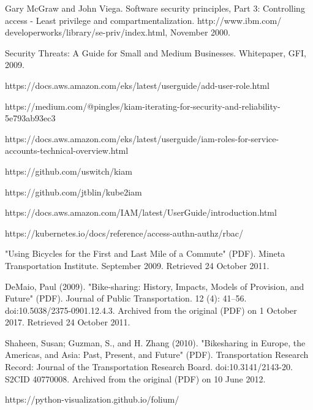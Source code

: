 \documentclass[thesis=M,czech]{FITthesis}[2019/12/23]
\theoremstyle{plain}
\theoremstyle{definition}
\begin{document}
\begin{thebibliography}{9}

Gary McGraw and John Viega. Software security principles, Part 3: Controlling access - Least privilege and compartmentalization. http://www.ibm.com/
developerworks/library/se-priv/index.html, November 2000.


Security Threats: A Guide for Small and Medium Businesses. Whitepaper,
GFI, 2009.

https://docs.aws.amazon.com/eks/latest/userguide/add-user-role.html



https://medium.com/@pingles/kiam-iterating-for-security-and-reliability-5e793ab93ec3 


https://docs.aws.amazon.com/eks/latest/userguide/iam-roles-for-service-accounts-technical-overview.html 


https://github.com/uswitch/kiam




https://github.com/jtblin/kube2iam



https://docs.aws.amazon.com/IAM/latest/UserGuide/introduction.html


https://kubernetes.io/docs/reference/access-authn-authz/rbac/


"Using Bicycles for the First and Last Mile of a Commute" (PDF). Mineta Transportation Institute. September 2009. Retrieved 24 October 2011.


DeMaio, Paul (2009). "Bike-sharing: History, Impacts, Models of Provision, and Future" (PDF). Journal of Public Transportation. 12 (4): 41–56. doi:10.5038/2375-0901.12.4.3. Archived from the original (PDF) on 1 October 2017. Retrieved 24 October 2011.


Shaheen, Susan; Guzman, S., and H. Zhang (2010). "Bikesharing in Europe, the Americas, and Asia: Past, Present, and Future" (PDF). Transportation Research Record: Journal of the Transportation Research Board. doi:10.3141/2143-20. S2CID 40770008. Archived from the original (PDF) on 10 June 2012.



https://python-visualization.github.io/folium/
\end{thebibliography}
\end{document}
